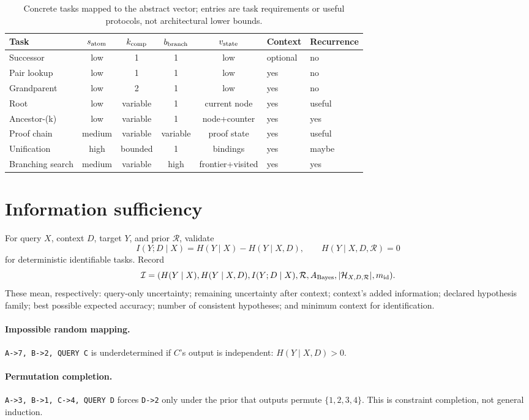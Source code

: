 \documentclass[10pt]{article}
\begin{document}
\begin{table}[H]\centering\small
\begin{tabularx}{\linewidth}{lccccYY}\toprule Task&$s_{\rm atom}$&$k_{\rm comp}$&$b_{\rm branch}$&$v_{\rm state}$&Context&Recurrence\\\midrule
Successor&low&1&1&low&optional&no\\ Pair lookup&low&1&1&low&yes&no\\ Grandparent&low&2&1&low&yes&no\\ Root&low&variable&1&current node&yes&useful\\ Ancestor-(k)&low&variable&1&node+counter&yes&yes\\ Proof chain&medium&variable&variable&proof state&yes&useful\\ Unification&high&bounded&1&bindings&yes&maybe\\ Branching search&medium&variable&high&frontier+visited&yes&yes\\\bottomrule\end{tabularx}
\caption{Concrete tasks mapped to the abstract vector; entries are task requirements or useful protocols, not architectural lower bounds.}\end{table}

\section{Information sufficiency}
For query $X$, context $D$, target $Y$, and prior $\mathcal R$, validate
\[
I(Y;D\mid X)=H(Y\mid X)-H(Y\mid X,D),\qquad H(Y\mid X,D,\mathcal R)=0
\]
for deterministic identifiable tasks. Record
\[
\mathcal I=(H(Y\mid X),H(Y\mid X,D),I(Y;D\mid X),\mathcal R,A_{\rm Bayes},|\mathcal H_{X,D,\mathcal R}|,m_{\rm id}).
\]
These mean, respectively: query-only uncertainty; remaining uncertainty after context; context's added information; declared hypothesis family; best possible expected accuracy; number of consistent hypotheses; and minimum context for identification.

\paragraph{Impossible random mapping.} \texttt{A->7, B->2, QUERY C} is underdetermined if $C$'s output is independent: $H(Y\mid X,D)>0$.
\paragraph{Permutation completion.} \texttt{A->3, B->1, C->4, QUERY D} forces \texttt{D->2} only under the prior that outputs permute $\{1,2,3,4\}$. This is constraint completion, not general induction.
\end{document}
